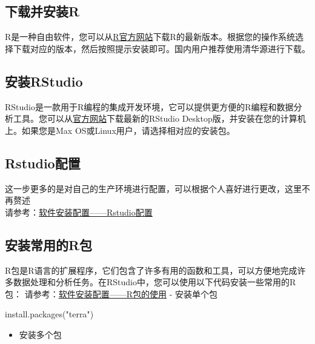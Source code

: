 \documentclass[
]{book}
\newenvironment{Shaded}{\begin{snugshade}}{\end{snugshade}}
\newcommand{\FunctionTok}[1]{\textcolor[rgb]{0.00,0.00,0.00}{#1}}
\newcommand{\NormalTok}[1]{#1}
\newcommand{\StringTok}[1]{\textcolor[rgb]{0.31,0.60,0.02}{#1}}
\providecommand{\tightlist}{%
  \setlength{\itemsep}{0pt}\setlength{\parskip}{0pt}}
\begin{document}
\hypertarget{ux4e0bux8f7dux5e76ux5b89ux88c5r}{%
\subsection{下载并安装R}\label{ux4e0bux8f7dux5e76ux5b89ux88c5r}}

R是一种自由软件，您可以从\href{https://www.r-project.org}{R官方网站}下载R的最新版本。根据您的操作系统选择下载对应的版本，然后按照提示安装即可。国内用户推荐使用清华源进行下载。

\hypertarget{ux5b89ux88c5rstudio}{%
\subsection{安装RStudio}\label{ux5b89ux88c5rstudio}}

RStudio是一款用于R编程的集成开发环境，它可以提供更方便的R编程和数据分析工具。您可以从\href{https://www.rstudio.com/}{官方网站}下载最新的RStudio Desktop版，并安装在您的计算机上。如果您是Max OS或Linux用户，请选择相对应的安装包。

\hypertarget{rstudioux914dux7f6e}{%
\subsection{Rstudio配置}\label{rstudioux914dux7f6e}}

这一步更多的是对自己的生产环境进行配置，可以根据个人喜好进行更改，这里不再赘述\\
请参考：\href{https://www.jianshu.com/p/d5360a387311}{软件安装配置------Rstudio配置}

\hypertarget{ux5b89ux88c5ux5e38ux7528ux7684rux5305}{%
\subsection{安装常用的R包}\label{ux5b89ux88c5ux5e38ux7528ux7684rux5305}}

R包是R语言的扩展程序，它们包含了许多有用的函数和工具，可以方便地完成许多数据处理和分析任务。在RStudio中，您可以使用以下代码安装一些常用的R包：
请参考：\href{https://www.jianshu.com/p/5a066d66d3d3}{软件安装配置------R包的使用}
- 安装单个包

\begin{Shaded}
\begin{Highlighting}[]
\FunctionTok{install.packages}\NormalTok{(}\StringTok{"terra"}\NormalTok{)}
\end{Highlighting}
\end{Shaded}

\begin{itemize}
\tightlist
\item
  安装多个包
\end{itemize}
\end{document}
